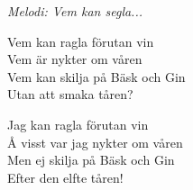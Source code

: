 {\footnotesize\textit{Melodi: Vem kan segla...}}\par
\vspace{10pt}
Vem kan ragla förutan vin\\
Vem är nykter om våren\\
Vem kan skilja på Bäsk och Gin\\
Utan att smaka tåren?\par
\vspace{10pt}
Jag kan ragla förutan vin\\
Å visst var jag nykter om våren\\
Men ej skilja på Bäsk och Gin\\
Efter den elfte tåren!
